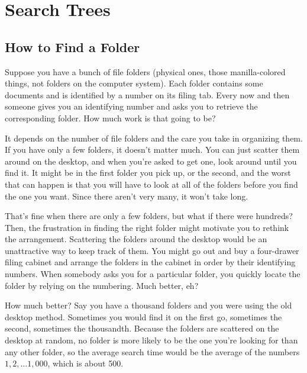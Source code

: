 \chapter{Search Trees}



\section{How to Find a Folder}

Suppose you have a bunch of file folders (physical ones, those
manilla-colored things, not folders on the computer system). Each
folder contains some documents and is identified by a number on its
filing tab. Every now and then someone gives you an identifying
number and asks you to retrieve the corresponding folder. How much
work is that going to be?

It depends on the number of file folders and the care you take in
organizing them. If you have only a few folders, it doesn't matter
much. You can just scatter them around on the desktop, and when
you're asked to get one, look around until you find it. It might be
in the first folder you pick up, or the second, and the worst that
can happen is that you will have to look at all of the folders
before you find the one you want. Since there aren't very many, it
won't take long.

That's fine when there are only a few folders, but what if there
were hundreds? Then, the frustration in finding the right folder
might motivate you to rethink the arrangement. Scattering the
folders around the desktop would be an unattractive way to keep
track of them. You might go out and buy a four-drawer filing cabinet
and arrange the folders in the cabinet in order by their identifying
numbers. When somebody asks you for a particular folder, you quickly
locate the folder by relying on the numbering. Much better, eh?

How much better? Say you have a thousand folders and you were using the
old desktop method. Sometimes you would find it on the first go,
sometimes the second, sometimes the thousandth. Because the folders
are scattered on the desktop at random, no folder is more likely to
be the one you're looking for than any other folder, so the average
search time would be the average of the numbers $1, 2,\ldots 1,000$,
which is about 500.

